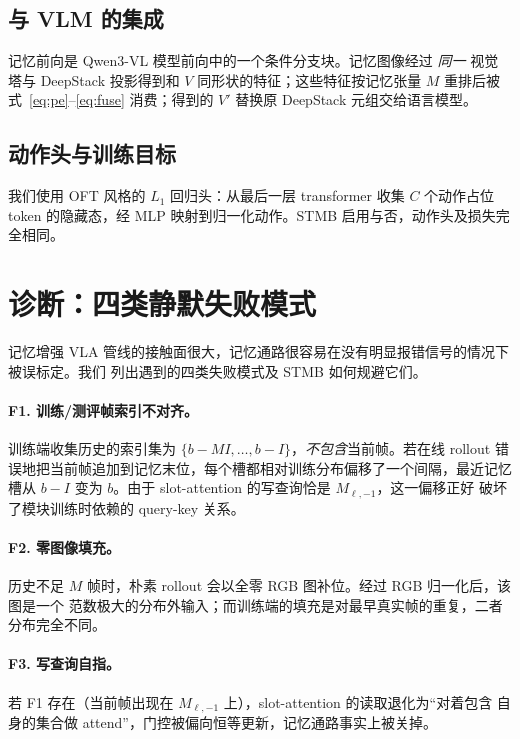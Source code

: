 \documentclass[11pt]{ctexart}
\begin{document}
\subsection{与 VLM 的集成}
记忆前向是 Qwen3-VL 模型前向中的一个条件分支块。记忆图像经过 \emph{同一} 视觉塔与
DeepStack 投影得到和 $V$ 同形状的特征；这些特征按记忆张量 $M$ 重排后被
式~\eqref{eq:pe}–\eqref{eq:fuse} 消费；得到的 $V'$ 替换原 DeepStack 元组交给语言模型。

\subsection{动作头与训练目标}
我们使用 OFT 风格的 $L_1$ 回归头：从最后一层 transformer 收集 $C$ 个动作占位 token
的隐藏态，经 MLP 映射到归一化动作。STMB 启用与否，动作头及损失完全相同。

\section{诊断：四类静默失败模式}
\label{sec:diagnostics}

记忆增强 VLA 管线的接触面很大，记忆通路很容易在没有明显报错信号的情况下被误标定。我们
列出遇到的四类失败模式及 STMB 如何规避它们。

\paragraph{F1. 训练/测评帧索引不对齐。}
训练端收集历史的索引集为 $\{b - M I, \dots, b - I\}$，\emph{不包含}当前帧。若在线
rollout 错误地把当前帧追加到记忆末位，每个槽都相对训练分布偏移了一个间隔，最近记忆
槽从 $b - I$ 变为 $b$。由于 slot-attention 的写查询恰是 $M_{\ell,-1}$，这一偏移正好
破坏了模块训练时依赖的 query-key 关系。

\paragraph{F2. 零图像填充。}
历史不足 $M$ 帧时，朴素 rollout 会以全零 RGB 图补位。经过 RGB 归一化后，该图是一个
范数极大的分布外输入；而训练端的填充是对最早真实帧的重复，二者分布完全不同。

\paragraph{F3. 写查询自指。}
若 F1 存在（当前帧出现在 $M_{\ell,-1}$ 上），slot-attention 的读取退化为“对着包含
自身的集合做 attend”，门控被偏向恒等更新，记忆通路事实上被关掉。
\end{document}
